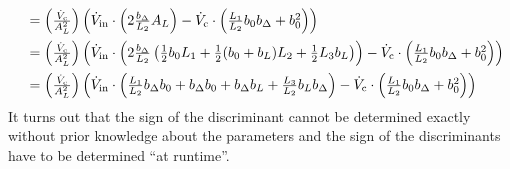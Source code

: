 \begin{equation}
\begin{array}{lll}
    \\\addlinespace
    &=   \left( \frac{\Vc}{\AL^2} \right)     
      \left(       
      \Vin  \cdot  \left(
      2 \frac{\bDelta}{L_2} \AL
      \right)
      - \Vc
      \cdot \left(      
      \frac{L_1}{L_2}  b_0\bDelta        
      + b_0^2                   
      \right)     
      \right)      
    \\\addlinespace
    &=
      \left( \frac{\Vc}{\AL^2} \right)     
      \left(       
      \Vin  \cdot  \left(
      2 \frac{\bDelta}{L_2}
      \left(
      \frac{1}{2} b_0  L_1 
      +  \frac{1}{2} (b_0 + b_L) L_2 
      + \frac{1}{2} L_3\bL        
      \right)      
      \right)
      - \Vc
      \cdot \left(      
      \frac{L_1}{L_2}  b_0\bDelta        
      + b_0^2                   
      \right)     
      \right)
    \\\addlinespace
    &=
      \left( \frac{\Vc}{\AL^2} \right)     
      \left(       
      \Vin  \cdot  \left(
      \frac{L_1 }{L_2} \bDelta b_0
      + \bDelta b_0
      + \bDelta b_L
      + \frac{L_3}{L_2} b_L \bDelta
      \right)          
      - \Vc
      \cdot \left(      
      \frac{L_1}{L_2}  b_0\bDelta        
      + b_0^2                   
      \right)
      \right)
  \end{array}
\end{equation}
It turns out that the sign of the discriminant cannot be determined exactly without prior knowledge about the 
parameters and the sign of the discriminants have to be determined ``at runtime''.\clearpage
